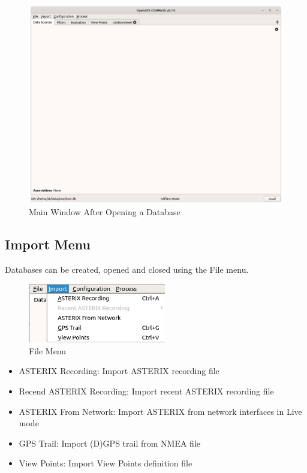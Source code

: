 \begin{figure}[H]
  \hspace*{-2.5cm}
    \includegraphics[width=19cm]{figures/main_window_opened.png}
  \caption{Main Window After Opening a Database}
\end{figure}

\subsection{Import Menu}

Databases can be created, opened and closed using the File menu.

\begin{figure}[H]
  \center
    \includegraphics[width=6cm,frame]{figures/ui_import_menu.png}
  \caption{File Menu}
\end{figure}

\begin{itemize}
 \item ASTERIX Recording: Import ASTERIX recording file
 \item Recend ASTERIX Recording: Import recent ASTERIX recording file
 \item ASTERIX From Network: Import ASTERIX from network interfaces in Live mode
 \item GPS Trail: Import (D)GPS trail from NMEA file
 \item View Points: Import View Points definition file
\end{itemize}
\  \\

